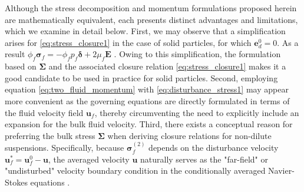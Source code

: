 Although the stress decomposition and momentum formulations proposed herein are mathematically equivalent, each presents distinct advantages and limitations, which we examine in detail below.
First, we may observe that a simplification arises for \ref{eq:stress_closure1} in the case of solid particles, for which $\textbf{e}_d^0 = 0$.
As a result $\phi _f \bm \sigma _f = - \phi _f p_f \bm\delta + 2 \mu_ f \textbf{E}$ \citep{joseph1990ensemble,jackson2000}. %
Owing to this simplification, the formulation based on $\bm\Sigma$ and the associated closure relation \eqref{eq:stress_closure1} makes it a good candidate to be used in practice for solid particles. %
Second, employing equation \ref{eq:two_fluid_momentum} with \ref{eq:disturbance_stress1} may appear more convenient as the governing equations are directly formulated in terms of the fluid velocity field $\textbf{u}_f$, thereby circumventing the need to explicitly include an expansion for the bulk fluid velocity. %
Third, there exists a conceptual reason for preferring the bulk stress $\bm\Sigma$ when deriving closure relations for non-dilute suspensions.  %
Specifically, because $\bm\sigma_f^{(2)}$ depends on the disturbance velocity $\textbf{u}_f^* = \textbf{u}_f^0 - \textbf{u}$, the averaged velocity $\textbf{u}$ naturally serves as the "far-field" or "undisturbed" velocity boundary condition in the conditionally averaged Navier-Stokes equations \citep{hinch1977averaged,fintzi2025}. %
